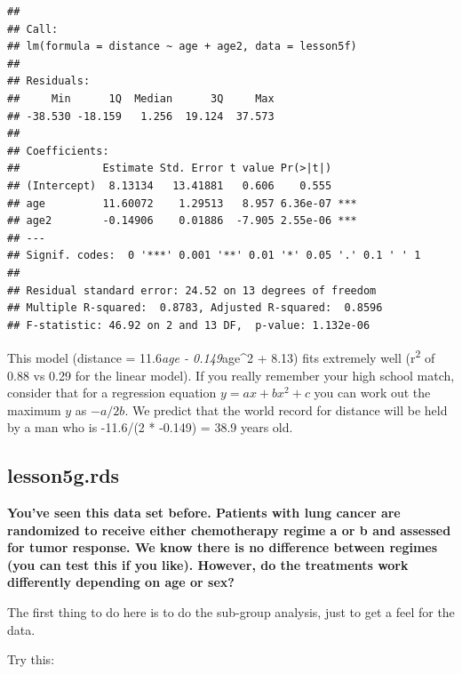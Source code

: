 \documentclass[]{book}
\newenvironment{Shaded}{\begin{snugshade}}{\end{snugshade}}
\newcommand{\CommentTok}[1]{\textcolor[rgb]{0.56,0.35,0.01}{\textit{#1}}}
\newcommand{\DataTypeTok}[1]{\textcolor[rgb]{0.13,0.29,0.53}{#1}}
\newcommand{\DecValTok}[1]{\textcolor[rgb]{0.00,0.00,0.81}{#1}}
\newcommand{\KeywordTok}[1]{\textcolor[rgb]{0.13,0.29,0.53}{\textbf{#1}}}
\newcommand{\NormalTok}[1]{#1}
\newcommand{\OperatorTok}[1]{\textcolor[rgb]{0.81,0.36,0.00}{\textbf{#1}}}
\newcommand{\StringTok}[1]{\textcolor[rgb]{0.31,0.60,0.02}{#1}}
\begin{document}
\begin{verbatim}
## 
## Call:
## lm(formula = distance ~ age + age2, data = lesson5f)
## 
## Residuals:
##     Min      1Q  Median      3Q     Max 
## -38.530 -18.159   1.256  19.124  37.573 
## 
## Coefficients:
##             Estimate Std. Error t value Pr(>|t|)    
## (Intercept)  8.13134   13.41881   0.606    0.555    
## age         11.60072    1.29513   8.957 6.36e-07 ***
## age2        -0.14906    0.01886  -7.905 2.55e-06 ***
## ---
## Signif. codes:  0 '***' 0.001 '**' 0.01 '*' 0.05 '.' 0.1 ' ' 1
## 
## Residual standard error: 24.52 on 13 degrees of freedom
## Multiple R-squared:  0.8783, Adjusted R-squared:  0.8596 
## F-statistic: 46.92 on 2 and 13 DF,  p-value: 1.132e-06
\end{verbatim}

This model (distance = 11.6\emph{age - 0.149}age\^{}2 + 8.13) fits extremely well (r\textsuperscript{2} of 0.88 vs 0.29 for the linear model). If you really remember your high school match, consider that for a regression equation \(y = ax + bx^2 + c\) you can work out the maximum \(y\) as \(-a/2b\). We predict that the world record for distance will be held by a man who is -11.6/(2 * -0.149) = 38.9 years old.

\hypertarget{lesson5g.rds}{%
\subsection{lesson5g.rds}\label{lesson5g.rds}}

\textbf{You've seen this data set before. Patients with lung cancer are randomized to receive either chemotherapy regime a or b and assessed for tumor response. We know there is no difference between regimes (you can test this if you like). However, do the treatments work differently depending on age or sex?}

The first thing to do here is to do the sub-group analysis, just to get a feel for the data.

Try this:

\begin{Shaded}
\end{Shaded}
\end{document}
